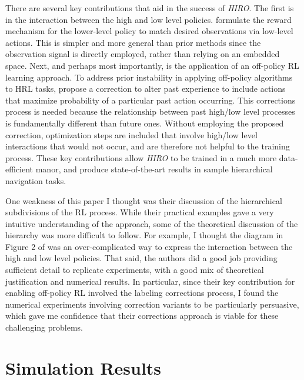 \documentclass{article}
\begin{document}
There are several key contributions that aid in the success of \textit{HIRO}. The first is in the interaction between the high and low level policies. \citep{ofir} formulate the reward mechanism for the lower-level policy to match desired observations via low-level actions. This is simpler and more general than prior methods since the observation signal is directly employed, rather than relying on an embedded space. Next, and perhaps most importantly, is the application of an off-policy RL learning approach. To address prior instability in applying off-policy algorithms to HRL tasks, \citep{ofir} propose a correction to alter past experience to include actions that maximize probability of a particular past action occurring. This corrections process is needed because the relationship between past high/low level processes is fundamentally different than future ones. Without employing the proposed correction, optimization steps are included that involve high/low level interactions that would not occur, and are therefore not helpful to the training process. These key contributions allow \textit{HIRO} to be trained in a much more data-efficient manor, and produce state-of-the-art results in sample hierarchical navigation tasks.

One weakness of this paper I thought was their discussion of the hierarchical subdivisions of the RL process. While their practical examples gave a very intuitive understanding of the approach, some of the theoretical discussion of the hierarchy was more difficult to follow. For example, I thought the diagram in Figure 2 of \citep{ofir} was an over-complicated way to express the interaction between the high and low level policies. That said, the authors did a good job providing sufficient detail to replicate experiments, with a good mix of theoretical justification and numerical results. In particular, since their key contribution for enabling off-policy RL involved the labeling corrections process, I found the numerical experiments involving correction variants to be particularly persuasive, which gave me confidence that their corrections approach is viable for these challenging problems.





\section{Simulation Results}
\end{document}
